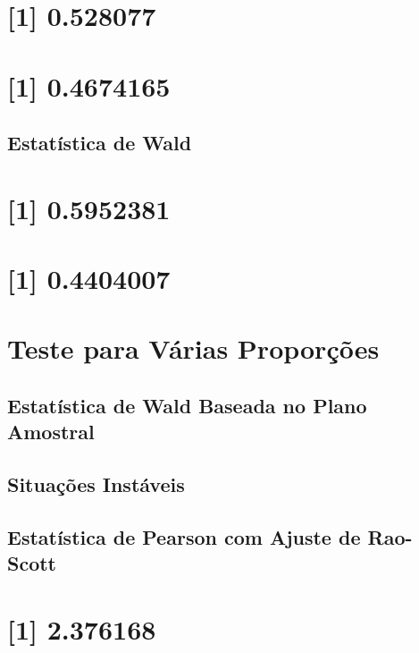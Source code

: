 \documentclass[]{book}
\theoremstyle{definition}
\theoremstyle{definition}
\theoremstyle{definition}
\theoremstyle{remark}
\begin{document}
\section{{[}1{]} 0.528077}\label{section-47}

\section{{[}1{]} 0.4674165}\label{section-48}

\subsection{Estatística de Wald}\label{estatistica-de-wald}

\section{{[}1{]} 0.5952381}\label{section-49}

\section{{[}1{]} 0.4404007}\label{section-50}

\section{Teste para Várias
Proporções}\label{teste-para-varias-proporcoes}

\subsection{Estatística de Wald Baseada no Plano
Amostral}\label{estatistica-de-wald-baseada-no-plano-amostral}

\subsection{Situações Instáveis}\label{situacoes-instaveis}

\subsection{Estatística de Pearson com Ajuste de
Rao-Scott}\label{raoscott}

\section{{[}1{]} 2.376168}\label{section-51}
\end{document}
